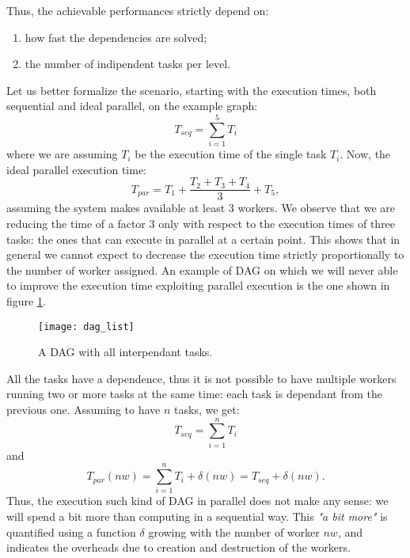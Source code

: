 \documentclass[a4paper,11pt]{article}
\begin{document}
Thus, the achievable performances strictly depend on:
\begin{enumerate}
	\item how fast the dependencies are solved;
	\item the number of indipendent tasks per level. 
\end{enumerate}
Let us better formalize the scenario, starting with the execution times, both sequential and ideal parallel, on the example graph:
\begin{equation}
	T_{seq} = \sum_{i=1}^{5} T_i
\end{equation}
where we are assuming $T_i$ be the execution time of the single task $T_i$.
Now, the ideal parallel execution time:
\begin{equation}
	T_{par} = T_1+ \frac{T_2+T_3+T_4}{3} + T_5,
\end{equation}
assuming the system makes available at least 3 workers.
We observe that we are reducing the time of a factor 3 only with respect to the execution times of three tasks: the ones that can execute in parallel at a certain point.
This shows that in general we cannot expect to decrease the execution time strictly proportionally to the number of worker assigned.
An example of DAG on which we will never able to improve the execution time exploiting parallel execution is the one shown in figure \ref{fig:dag_list}.

\begin{figure}[h]
	\centering
	\texttt{[image: dag\_list]}
	\caption{A DAG with all interpendant tasks.}
	\label{fig:dag_list}
\end{figure}
All the tasks have a dependence, thus it is not possible to have multiple workers running two or more tasks at the same time: each task is dependant from the previous one.
Assuming to have $n$ tasks, we get:
\begin{equation}
	T_{seq} = \sum_{i=1}^{n} T_i
\end{equation}
and 
\begin{equation}
	T_{par}(nw) = \sum_{i=1}^{n} T_i + \delta(nw) = T_{seq} + \delta(nw). 
\end{equation}
Thus, the execution such kind of DAG in parallel does not make any sense: we will spend a bit more than computing in a sequential way.
This \textit{"a bit more"} is quantified using a function $\delta$ growing with the number of worker $nw$, and indicates the overheads due to creation and destruction of the workers.
\end{document}
